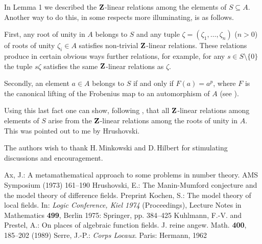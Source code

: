 \documentclass[amalog]{svjour}
\def \Z {{\bold Z}}
\begin{document}
\begin{rem}In Lemma 1 we described the $\Z$-linear
relations among the elements of $S\subseteq A$. Another way to do this, in some respects more illuminating, is as follows.

 First, any root of unity in $A$ belongs to $S$ and any
tuple $\zeta = (\zeta_1,\dots,\zeta_n)$ ($n>0$) of roots of unity
$\zeta_i\in A$ satisfies non-trivial $\Z$-linear relations. These relations produce
 in certain obvious ways further relations, for example, for any $s\in S\setminus \{0\}$ the tuple $s\zeta$ satisfies the same $\Z$-linear relations
as $\zeta$.

 Secondly, an element $a\in A$ belongs to $S$ if and only if $F(a)=a^p$, where $F$ is the canonical lifting of the Frobenius map to
an automorphism of $A$ (see \cite{ref5}).

Using this last fact one can show,
following \cite{ref2}, that all $\Z$-linear relations among elements of
$S$ arise from the $\Z$-linear relations among the roots of unity in $A$.
This was pointed out to me by Hrushovski.
\end{rem}
\begin{acknowledgement}The authors wish to thank H.\,Minkowski and
D.\,Hilbert for stimulating discussions and encouragement.
\end{acknowledgement}

\begin{thebibliography}{[KuPr89]}
  Ax, J.:
A metamathematical approach to some problems in number theory.
AMS Symposium  (1973) 161--190
 Hrushovski, E.:
The Manin-Mumford conjecture and the model theory of difference fields.
Preprint
 Kochen, S.:
The model theory of local fields. In: {\it Logic
Conference, Kiel 1974} (Proceedings),
Lecture Notes in Mathematics {\bf499},  Berlin 1975: Springer, pp.
384--425
  Kuhlmann, F.-V. and  Prestel, A.:
On places of algebraic function fields.
J. reine angew. Math. {\bf400}, 185--202  (1989)
 Serre, J.-P.:
{\it Corps Locaux}. Paris: Hermann, 1962
\end{thebibliography}
\end{document}
